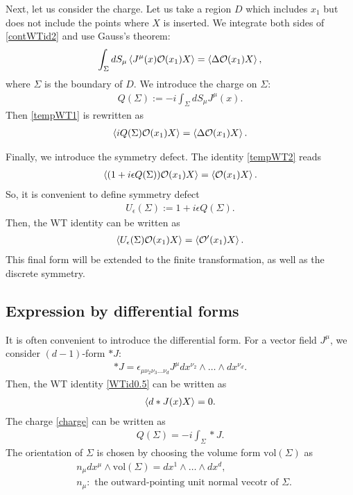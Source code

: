 \documentclass[12pt]{scrartcl}
\newcommand{\Ocal}{\mathcal{O}}
\begin{document}
Next, let us consider the charge.  Let us take a region $D$ which includes $x_1$ but does not include the points where $X$ is inserted. We integrate both sides of \eqref{contWTid2} and use Gauss's theorem:
\begin{align}
    \int_{\Sigma}dS_{\mu}\expval{J^{\mu}(x)\Ocal(x_1)X}=\expval{\Delta \Ocal(x_1)X},\label{tempWT1}
\end{align}
where $\Sigma$ is the boundary of $D$.  We introduce the charge on $\Sigma$:
\begin{align}
    Q(\Sigma):=-i\int_{\Sigma}dS_{\mu} J^{\mu}(x).\label{charge}
\end{align}
Then \eqref{tempWT1} is rewritten as
\begin{align}
    \expval{iQ(\Sigma)\Ocal(x_1)X}=
    \expval{\Delta \Ocal(x_1)X}.
    \label{tempWT2}
\end{align}

Finally, we introduce the symmetry defect.  The identity \eqref{tempWT2} reads
\begin{align}
    \expval{(1+i\epsilon Q(\Sigma))\Ocal(x_1)X}=\expval{\Ocal(x_1)X}.
\end{align}
So, it is convenient to define symmetry defect
\begin{align}
    U_{\epsilon}(\Sigma):=
    1+i\epsilon Q(\Sigma).
\end{align}
Then, the WT identity can be written as
\begin{align}
    \expval{U_{\epsilon}(\Sigma)\Ocal(x_1) X}=\expval{\Ocal'(x_1)X}.
\end{align}
This final form will be extended to the finite transformation, as well as the discrete symmetry.
\subsection{Expression by differential forms}

It is often convenient to introduce the differential form.  For a vector field $J^{\mu}$, we consider $(d-1)$-form $*J$:
\begin{align}
    *J=\epsilon_{\mu\nu_2\nu_3\dots \nu_d}J^{\mu}dx^{\nu_2}\wedge \dots \wedge dx^{\nu_d}.
\end{align}
Then, the WT identity \eqref{WTid0.5} can be written as
\begin{align}
    \expval{d*J(x) X}=0.
\end{align}
The charge \eqref{charge} can be written as
\begin{align}
    Q(\Sigma)=-i\int_{\Sigma}*J.
\end{align}
The orientation of $\Sigma$ is chosen by choosing the volume form $\mathrm{vol}(\Sigma)$ as
\begin{align}
    &n_{\mu}dx^{\mu}\wedge \mathrm{vol}(\Sigma)=dx^{1}\wedge \dots \wedge dx^{d},\\
    &n_{\mu}:\text{ the outward-pointing unit normal vecotr of } \Sigma.\nonumber
\end{align}
\end{document}
